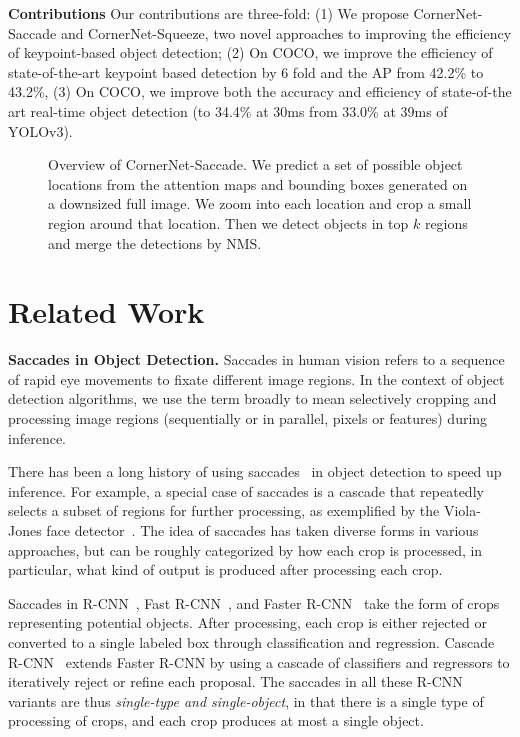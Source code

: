 \documentclass{bmvc2k}
\begin{document}
\smallskip \noindent \textbf{Contributions} Our contributions are three-fold: (1) We propose CornerNet-Saccade and CornerNet-Squeeze, two novel approaches to improving the efficiency of keypoint-based object detection; (2) On COCO, we improve the efficiency of state-of-the-art keypoint based detection by 6 fold and the AP from 42.2\% to 43.2\%, (3) On COCO, we improve both the accuracy and efficiency of state-of-the art real-time object detection (to 34.4\% at 30ms from 33.0\% at 39ms of YOLOv3).

\begin{figure}
    \centering
    \caption{Overview of CornerNet-Saccade. We predict a set of possible object locations from the attention maps and bounding boxes generated on a downsized full image. We zoom into each location and crop a small region around that location. Then we detect objects in top $k$ regions and merge the detections by NMS.}
    \label{fig:overview}
    \vspace{-3mm}
\end{figure}

\section{Related Work}
\smallskip \noindent \textbf{Saccades in Object Detection.} 
Saccades in human vision refers to a sequence of rapid eye movements to fixate different image regions. In the context of object detection algorithms, we use the term broadly to mean selectively cropping and processing image regions (sequentially or in parallel, pixels or features) during inference. 

There has been a long history of using saccades~\cite{gualdi2011multistage,pedersoli2010recursive,zhang2007real} in object detection to speed up inference. For example, a special case of saccades is a cascade that repeatedly selects a subset of regions for further processing, as exemplified by the Viola-Jones face detector~\cite{viola2001rapid}. 
The idea of saccades has taken diverse forms in various approaches, but can be roughly categorized by how each crop is processed, in particular, what kind of output is produced after processing each crop. 

Saccades in R-CNN~\cite{girshick2014rich}, Fast R-CNN~\cite{girshick2015fast}, and Faster R-CNN~\cite{ren2015faster} take the form of crops representing potential objects. After processing, each crop is either rejected or converted to a single labeled box through classification and regression. Cascade R-CNN~\cite{cai2018cascade} extends Faster R-CNN by using a cascade of classifiers and regressors to iteratively reject or refine each proposal. The saccades in all these R-CNN variants  are thus \emph{single-type and single-object}, in that there is a single type of processing of crops, and each crop produces at most a single object. 
\end{document}
